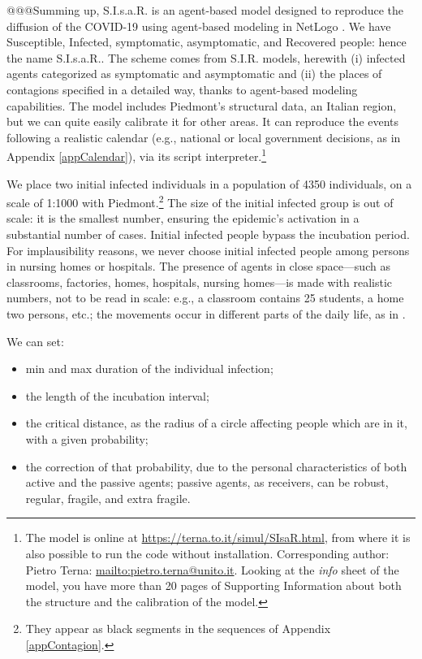 \documentclass[graybox]{svmult}
\begin{document}
@@@Summing up, S.I.s.a.R. \cite{SIsaR} is an agent-based model designed to reproduce the diffusion of the COVID-19 using agent-based modeling in NetLogo \cite{NetLogo}. We have Susceptible, Infected, symptomatic, asymptomatic, and Recovered people: hence the name S.I.s.a.R.. The scheme comes from S.I.R. models, herewith (i) infected agents categorized as symptomatic and asymptomatic and (ii) the places of contagions specified in a detailed way, thanks to agent-based modeling capabilities. The model includes Piedmont's structural data, an Italian region, but we can quite easily calibrate it for other areas. It can reproduce the events following a realistic calendar (e.g., national or local government decisions, as in Appendix \ref{appCalendar}), via its script interpreter.\footnote{\label{modOnLine}The model is online at \url{https://terna.to.it/simul/SIsaR.html}, from where it is also possible to run the code without installation. Corresponding author: Pietro Terna: \url{mailto:pietro.terna@unito.it}. Looking at the \emph{info} sheet of the model, you have more than 20 pages of Supporting Information about both the structure and the calibration of the model.}

We place two initial infected individuals in a population of 4350 individuals, on a scale of 1:1000 with Piedmont.\footnote{They appear as black segments in the sequences of Appendix \ref{appContagion}.} The size of the initial infected group is out of scale: it is the smallest number, ensuring the epidemic's activation in a substantial number of cases. Initial infected people bypass the incubation period. For implausibility reasons, we never choose initial infected people among persons in nursing homes or hospitals. The presence of agents in close space---such as classrooms, factories, homes, hospitals, nursing homes---is made with realistic numbers, not to be read in scale: e.g., a classroom contains 25 students, a home two persons, etc.; the movements occur in different parts of the daily life, as in \cite{ghorbani2020assocc}.

We can set: 
\begin{itemize}
\setlength\itemsep{0.3em}
\item min and max duration of the individual infection;

\item the length of the incubation interval;

\item the critical distance, as the radius of a circle affecting people which are in it, with a given probability;

\item the correction of that probability, due to the personal characteristics of both active and the passive agents; passive agents, as receivers, can be robust, regular, fragile, and extra fragile.

\end{itemize} 
\end{document}
